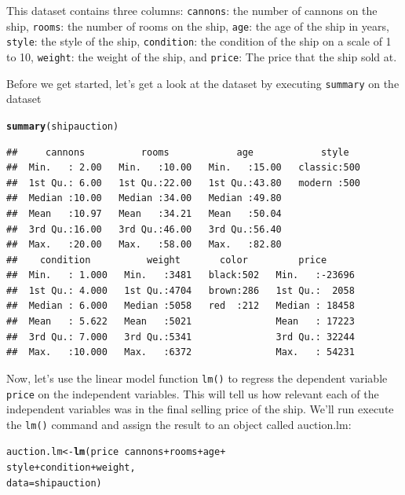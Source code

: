 \documentclass{tufte-book}\usepackage[]{graphicx}\usepackage[]{color}
\makeatletter
\newcommand{\hlopt}[1]{\textcolor[rgb]{0,0,0}{#1}}%
\newcommand{\hlstd}[1]{\textcolor[rgb]{0.345,0.345,0.345}{#1}}%
\newcommand{\hlkwb}[1]{\textcolor[rgb]{0.69,0.353,0.396}{#1}}%
\newcommand{\hlkwc}[1]{\textcolor[rgb]{0.333,0.667,0.333}{#1}}%
\newcommand{\hlkwd}[1]{\textcolor[rgb]{0.737,0.353,0.396}{\textbf{#1}}}%
\newenvironment{kframe}{%
 \def\at@end@of@kframe{}%
 \ifinner\ifhmode%
  \def\at@end@of@kframe{\end{minipage}}%
  \begin{minipage}{\columnwidth}%
 \fi\fi%
 \def\FrameCommand##1{\hskip\@totalleftmargin \hskip-\fboxsep
 \colorbox{shadecolor}{##1}\hskip-\fboxsep
     \hskip-\linewidth \hskip-\@totalleftmargin \hskip\columnwidth}%
 \MakeFramed {\advance\hsize-\width
   \@totalleftmargin\z@ \linewidth\hsize
   \@setminipage}}%
 {\par\unskip\endMakeFramed%
 \at@end@of@kframe}
\newenvironment{knitrout}{}{} %
\makeatother
\begin{document}
This dataset contains three columns: \texttt{cannons}: the number of cannons on the ship, \texttt{rooms}: the number of rooms on the ship, \texttt{age}: the age of the ship in years, \texttt{style}: the style of the ship, \texttt{condition}: the condition of the ship on a scale of 1 to 10, \texttt{weight}: the weight of the ship, and \texttt{price}: The price that the ship sold at.

Before we get started, let's get a look at the dataset by executing \texttt{summary} on the dataset

\begin{knitrout}
\color{fgcolor}\begin{kframe}
\begin{alltt}
\hlkwd{summary}\hlstd{(shipauction)}
\end{alltt}
\begin{verbatim}
##     cannons          rooms            age            style    
##  Min.   : 2.00   Min.   :10.00   Min.   :15.00   classic:500  
##  1st Qu.: 6.00   1st Qu.:22.00   1st Qu.:43.80   modern :500  
##  Median :10.00   Median :34.00   Median :49.80                
##  Mean   :10.97   Mean   :34.21   Mean   :50.04                
##  3rd Qu.:16.00   3rd Qu.:46.00   3rd Qu.:56.40                
##  Max.   :20.00   Max.   :58.00   Max.   :82.80                
##    condition          weight       color         price       
##  Min.   : 1.000   Min.   :3481   black:502   Min.   :-23696  
##  1st Qu.: 4.000   1st Qu.:4704   brown:286   1st Qu.:  2058  
##  Median : 6.000   Median :5058   red  :212   Median : 18458  
##  Mean   : 5.622   Mean   :5021               Mean   : 17223  
##  3rd Qu.: 7.000   3rd Qu.:5341               3rd Qu.: 32244  
##  Max.   :10.000   Max.   :6372               Max.   : 54231
\end{verbatim}
\end{kframe}
\end{knitrout}

Now, let's use the linear model function \texttt{lm()} to regress the dependent variable \texttt{price} on the independent variables. This will tell us how relevant each of the independent variables was in the final selling price of the ship. We'll run execute the \texttt{lm()} command and assign the result to an object called auction.lm:

\begin{knitrout}
\color{fgcolor}\begin{kframe}
\begin{alltt}
\hlstd{auction.lm} \hlkwb{<-} \hlkwd{lm}\hlstd{(price} \hlopt{~} \hlstd{cannons} \hlopt{+} \hlstd{rooms} \hlopt{+} \hlstd{age} \hlopt{+}
                   \hlstd{style} \hlopt{+} \hlstd{condition} \hlopt{+} \hlstd{weight,}
                 \hlkwc{data} \hlstd{= shipauction)}
\end{alltt}
\end{kframe}
\end{knitrout}
\end{document}
